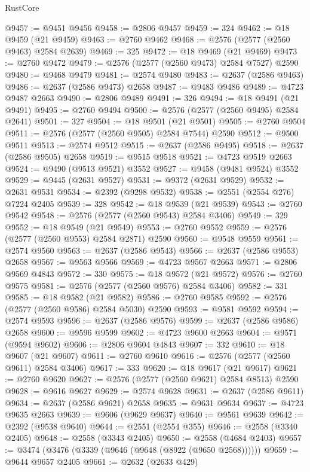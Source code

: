 \begin{lexlean}{RustCore}
\begin{coremodule}
@9457 := @9451 @9456
@9458 := @2806 @9457
@9459 := 324
@9462 := @18 @9459 (@21 @9459)
@9463 := @2760 @9462
@9468 := @2576 (@2577 (@2560 @9463) @2584 @2639)
@9469 := 325
@9472 := @18 @9469 (@21 @9469)
@9473 := @2760 @9472
@9479 := @2576 (@2577 (@2560 @9473) @2584 @7527) @2590
@9480 := @9468 @9479
@9481 := @2574 @9480
@9483 := @2637 (@2586 @9463)
@9486 := @2637 (@2586 @9473) @2658
@9487 := @9483 @9486
@9489 := @4723 @9487 @2663
@9490 := @2806 @9489
@9491 := 326
@9494 := @18 @9491 (@21 @9491)
@9495 := @2760 @9494
@9500 := @2576 (@2577 (@2560 @9495) @2584 @2641)
@9501 := 327
@9504 := @18 @9501 (@21 @9501)
@9505 := @2760 @9504
@9511 := @2576 (@2577 (@2560 @9505) @2584 @7544) @2590
@9512 := @9500 @9511
@9513 := @2574 @9512
@9515 := @2637 (@2586 @9495)
@9518 := @2637 (@2586 @9505) @2658
@9519 := @9515 @9518
@9521 := @4723 @9519 @2663
@9524 := @9490 (@9513 @9521) @3552
@9527 := @9458 (@9481 @9524) @3552
@9529 := @9445 (@2631 @9527)
@9531 := @9372 (@2631 @9529)
@9532 := @2631 @9531
@9534 := @2392 (@9298 @9532)
@9538 := @2551 (@2554 @276) @7224 @2405
@9539 := 328
@9542 := @18 @9539 (@21 @9539)
@9543 := @2760 @9542
@9548 := @2576 (@2577 (@2560 @9543) @2584 @3406)
@9549 := 329
@9552 := @18 @9549 (@21 @9549)
@9553 := @2760 @9552
@9559 := @2576 (@2577 (@2560 @9553) @2584 @2871) @2590
@9560 := @9548 @9559
@9561 := @2574 @9560
@9563 := @2637 (@2586 @9543)
@9566 := @2637 (@2586 @9553) @2658
@9567 := @9563 @9566
@9569 := @4723 @9567 @2663
@9571 := @2806 @9569 @4843
@9572 := 330
@9575 := @18 @9572 (@21 @9572)
@9576 := @2760 @9575
@9581 := @2576 (@2577 (@2560 @9576) @2584 @3406)
@9582 := 331
@9585 := @18 @9582 (@21 @9582)
@9586 := @2760 @9585
@9592 := @2576 (@2577 (@2560 @9586) @2584 @5030) @2590
@9593 := @9581 @9592
@9594 := @2574 @9593
@9596 := @2637 (@2586 @9576)
@9599 := @2637 (@2586 @9586) @2658
@9600 := @9596 @9599
@9602 := @4723 @9600 @2663
@9604 := @9571 (@9594 @9602)
@9606 := @2806 @9604 @4843
@9607 := 332
@9610 := @18 @9607 (@21 @9607)
@9611 := @2760 @9610
@9616 := @2576 (@2577 (@2560 @9611) @2584 @3406)
@9617 := 333
@9620 := @18 @9617 (@21 @9617)
@9621 := @2760 @9620
@9627 := @2576 (@2577 (@2560 @9621) @2584 @8513) @2590
@9628 := @9616 @9627
@9629 := @2574 @9628
@9631 := @2637 (@2586 @9611)
@9634 := @2637 (@2586 @9621) @2658
@9635 := @9631 @9634
@9637 := @4723 @9635 @2663
@9639 := @9606 (@9629 @9637)
@9640 := @9561 @9639
@9642 := @2392 (@9538 @9640)
@9644 := @2551 (@2554 @355)
@9646 := @2558 (@3340 @2405)
@9648 := @2558 (@3343 @2405)
@9650 := @2558 (@4684 @2403)
@9657 := @3474 (@3476 (@3339 (@9646 (@9648 (@8922 (@9650 @2568))))))
@9659 := @9644 @9657 @2405
@9661 := @2632 (@2633 @429)

\end{coremodule}
\end{lexlean}
